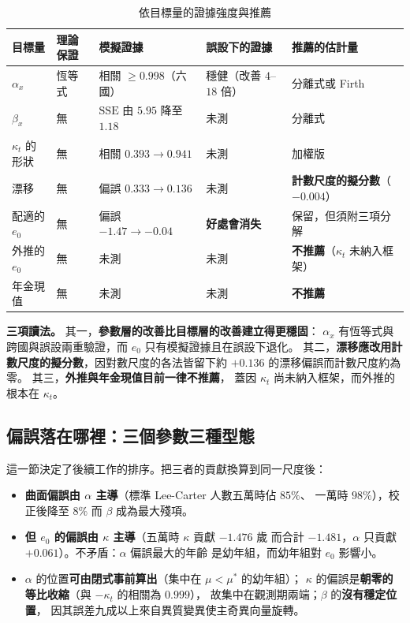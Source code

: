 \documentclass[UTF8, fontset=macnew, a4paper, 12pt]{ctexart}
\begin{document}
\begin{table}[H]
\centering
\caption{依目標量的證據強度與推薦}
\small
\renewcommand{\arraystretch}{1.15}
\begin{tabular}{p{2.3cm}p{2.5cm}p{2.3cm}p{2.3cm}p{2.5cm}}
\toprule
目標量 & 理論保證 & 模擬證據 & 誤設下的證據 & 推薦的估計量\\
\midrule
$\alpha_x$ & 恆等式 & 相關 $\ge0.998$（六國） & 穩健（改善 $4$--$18$ 倍） & 分離式或 Firth\\
$\beta_x$ & 無 & $\mathrm{SSE}$ 由 $5.95$ 降至 $1.18$ & 未測 & 分離式\\
$\kappa_t$ 的形狀 & 無 & 相關 $0.393\to0.941$ & 未測 & 加權版\\
漂移 & 無 & 偏誤 $0.333\to0.136$ & 未測 & \textbf{計數尺度的擬分數}（$-0.004$）\\
配適的 $e_0$ & 無 & 偏誤 $-1.47\to-0.04$ & \textbf{好處會消失} & 保留，但須附三項分解\\
外推的 $e_0$ & 無 & 未測 & 未測 & \textbf{不推薦}（$\kappa_t$ 未納入框架）\\
年金現值 & 無 & 未測 & 未測 & \textbf{不推薦}\\
\bottomrule
\end{tabular}
\label{t:target}
\end{table}

\textbf{三項讀法。} 其一，\textbf{參數層的改善比目標層的改善建立得更穩固}：
$\alpha_x$ 有恆等式與跨國與誤設兩重驗證，而 $e_0$ 只有模擬證據且在誤設下退化。
其二，\textbf{漂移應改用計數尺度的擬分數}，因對數尺度的各法皆留下約
$+0.136$ 的漂移偏誤而計數尺度約為零。
其三，\textbf{外推與年金現值目前一律不推薦}，
蓋因 $\kappa_t$ 尚未納入框架，而外推的根本在 $\kappa_t$。

\subsection{偏誤落在哪裡：三個參數三種型態}

這一節決定了後續工作的排序。把三者的貢獻換算到同一尺度後：

\begin{itemize}
\item \textbf{曲面偏誤由 $\alpha$ 主導}（標準 Lee-Carter 人數五萬時佔 $85\%$、
一萬時 $98\%$），校正後降至 $8\%$ 而 $\beta$ 成為最大殘項。
\item \textbf{但 $e_0$ 的偏誤由 $\kappa$ 主導}（五萬時 $\kappa$ 貢獻 $-1.476$ 歲
而合計 $-1.481$，$\alpha$ 只貢獻 $+0.061$）。不矛盾：$\alpha$ 偏誤最大的年齡
是幼年組，而幼年組對 $e_0$ 影響小。
\item $\alpha$ 的位置\textbf{可由閉式事前算出}（集中在 $\mu<\mu^{\ast}$ 的幼年組）；
$\kappa$ 的偏誤是\textbf{朝零的等比收縮}（與 $-\kappa_t$ 的相關為 $0.999$），
故集中在觀測期兩端；$\beta$ 的\textbf{沒有穩定位置}，
因其誤差九成以上來自異質變異使主奇異向量旋轉。
\end{itemize}
\end{document}
